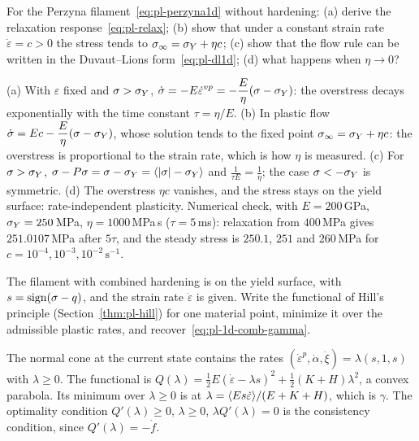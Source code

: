 \label{exo:pl-perzyna}
%
For the Perzyna filament~\eqref{eq:pl-perzyna1d} without hardening:
(a) derive the relaxation response~\eqref{eq:pl-relax}; (b) show that under a
constant strain rate $\dot\varepsilon=c>0$ the stress tends to
$\sigma_\infty=\sigma_{Y}+\eta c$; (c) show that the flow rule can be written in the
Duvaut--Lions form~\eqref{eq:pl-dl1d}; (d) what happens when $\eta\to0$?
\begin{solution}
(a) With $\varepsilon$ fixed and $\sigma>\sigma_{Y}$,
$\displaystyle \dot\sigma=-E\dot\varepsilon^{vp}=-\frac E\eta(\sigma-\sigma_{Y})$: the overstress
decays exponentially with the time constant $\tau=\eta/E$.
(b) In plastic flow $\displaystyle \dot\sigma=Ec-\frac E\eta(\sigma-\sigma_{Y})$, whose solution
tends to the fixed point $\sigma_\infty=\sigma_{Y}+\eta c$: the overstress is
proportional to the strain rate, which is how $\eta$ is measured.
(c) For $\sigma>\sigma_{Y}$, $\sigma-P\sigma=\sigma-\sigma_{Y}=\langle |\sigma|-\sigma_{Y}\rangle$ and
$\displaystyle \frac{1}{\tau E}=\frac1\eta$; the case $\sigma<-\sigma_{Y}$ is symmetric.
(d) The overstress $\eta c$ vanishes, and the stress stays on the yield
surface: rate-independent plasticity. Numerical check, with $E=200$\,GPa,
$\sigma_{Y}=250$\,MPa, $\eta=1000$\,MPa\,s ($\tau=5$\,ms): relaxation from
$400$\,MPa gives $251.0107$\,MPa after $5\tau$, and the steady stress is
$250.1$, $251$ and $260$\,MPa for $c=10^{-4},10^{-3},10^{-2}\,\mathrm{s}^{-1}$.

\end{solution}

\label{exo:pl-hill1d}
%
The filament with combined hardening is on the yield surface, with
$s=\operatorname{sign}(\sigma-q)$, and the strain rate $\dot\varepsilon$ is given. Write the
functional of Hill's principle (Section~\ref{thm:pl-hill}) for one material point, minimize it
over the admissible plastic rates, and recover~\eqref{eq:pl-1d-comb-gamma}.
\begin{solution}
The normal cone at the current state contains the rates
$(\dot\varepsilon^p,\dot\alpha,\dot\xi)=\lambda(s,1,s)$ with $\lambda\ge0$. The
functional is $Q(\lambda)=\tfrac12E(\dot\varepsilon-\lambda s)^2+\tfrac12(K+H)\lambda^2$,
a convex parabola. Its minimum over $\lambda\ge0$ is at
$\lambda=\langle Es\dot\varepsilon\rangle/(E+K+H)$, which is $\gamma$. The optimality
condition $Q'(\lambda)\ge0$, $\lambda\ge0$, $\lambda Q'(\lambda)=0$ is the consistency
condition, since $Q'(\lambda)=-\dot f$.
\end{solution}


